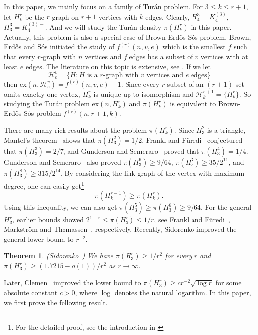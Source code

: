 \documentclass[10pt,a4paper]{amsart}
\numberwithin{equation}{section}
\newtheorem{theorem}{Theorem}[section]
\begin{document}
In this paper, we mainly focus on a family of Tur\'an problem. For $3\le k\le r+1$, let $H_k^r$ be the $r$-graph on $r+1$ vertices with $k$ edges. Clearly, $H_4^3=K_4^{(3)}$, $H_3^3=K_4^{(3)-}$. And we will study the Tur\'an density $\pi(H_k^r)$ in this paper. Actually, this problem  is also a special case of Brown-Erd\H{o}s-S\'os problem. Brown, Erd\H{o}s and S\'os \cite{BES} initiated the study of $f^{(r)}(n,v,e)$ which is the smallest $f$ such that every $r$-graph with $n$ vertices and $f$ edges has a subset of $v$ vertices with at least $e$ edges. The literature on this topic is extensive, see \cite{Alon,Postle,Glock,Glock2,Wang}. If we let
$$\mathcal{H}_e^v=\{H:\text{$H$ is a $r$-graph with $v$ vertices and $e$ edges}\}$$
then $\mathrm{ex}(n,\mathcal{H}_e^v)=f^{(r)}(n,v,e)-1$. Since every $r$-subset of an $(r+1)$-set omits exactly one vertex,  $H_k^r$ is unique up to isomorphism and $\mathcal{H}_k^{r+1}=\{H_k^r\}$. So studying the Tur\'an problem $\mathrm{ex}(n,H_k^r)$ and $\pi(H_k^r)$ is equivalent to Brown-Erd\H{o}s-S\'os problem $f^{(r)}(n,r+1,k)$.


There are many rich results about the problem $\pi(H_k^r)$. Since $H_3^2$ is a triangle, Mantel's theorem~\cite{Mantel1907} shows that $\pi(H_3^2)=1/2$. Frankl and F\"uredi~\cite{FranklFuredi1984} conjectured that $\pi(H_3^3)=2/7$, and Gunderson and Semeraro~\cite{GundersonSemeraro2017} proved that $\pi(H_3^4)=1/4$.
Gunderson and Semeraro~\cite{GundersonSemeraro2025} also proved $\pi(H_3^6)\ge 9/64$, $\pi(H_3^7)\ge 35/2^{11}$, and $\pi(H_3^8)\ge 315/2^{14}$.
By considering the link graph of the vertex with maximum degree, one can easily get\footnote{For the detailed proof, see the introduction in \cite{Sidorenko2024} } 
\begin{equation}\label{eq:monotonicity}
\pi(H_k^{r-1})\ge \pi(H_k^r).
\end{equation}
Using this inequality, we can also get $\pi(H_3^5)\ge\pi(H_3^6)\ge 9/64$. For the general $H_3^r$, earlier bounds showed $2^{1-r}\le \pi(H_3^r)\le 1/r$,
see Frankl and F\"uredi~\cite{FranklFuredi1984},  Markstr\"om and Thomassen~\cite{MarkstromThomassen2021}, respectively. Recently,
Sidorenko improved the general lower bound to $r^{-2}$.
\begin{theorem}\label{end:lem:positive}(Sidorenko~\cite{Sidorenko2024})
We have $\pi(H_3^r)\ge 1/r^{2}$ for every $r$ and
$\pi(H_3^r)\ge (1.7215-o(1))/r^{2}$ as $r\to\infty$.   
\end{theorem}
Later, 
Clemen~\cite{Clemen2026} improved the  lower bound to $\pi(H_3^r)\ge c r^{-2}\sqrt{\log r}$ for some absolute constant $c>0$, where $\log$ denotes the natural logarithm.
In this paper, we first prove the following result.
\end{document}
